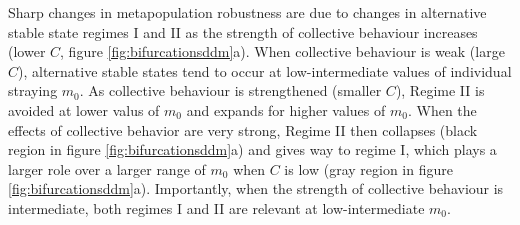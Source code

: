 \documentclass{revtex4}
\begin{document}
Sharp changes in metapopulation robustness are due to changes in alternative stable state regimes I and II as the strength of collective behaviour increases (lower $C$, figure \ref{fig:bifurcationsddm}a). 
When collective behaviour is weak (large $C$), alternative stable states tend to occur at low-intermediate values of individual straying $m_0$.
As collective behaviour is strengthened (smaller $C$), Regime II is avoided at lower valus of $m_0$ and expands for higher values of $m_0$.
When the effects of collective behavior are very strong, Regime II then collapses (black region in figure \ref{fig:bifurcationsddm}a) and gives way to regime I, which plays a larger role over a larger range of $m_0$ when $C$ is low (gray region in figure \ref{fig:bifurcationsddm}a).
Importantly, when the strength of collective behaviour is intermediate, both regimes I and II are relevant at low-intermediate $m_0$.

\end{document}
